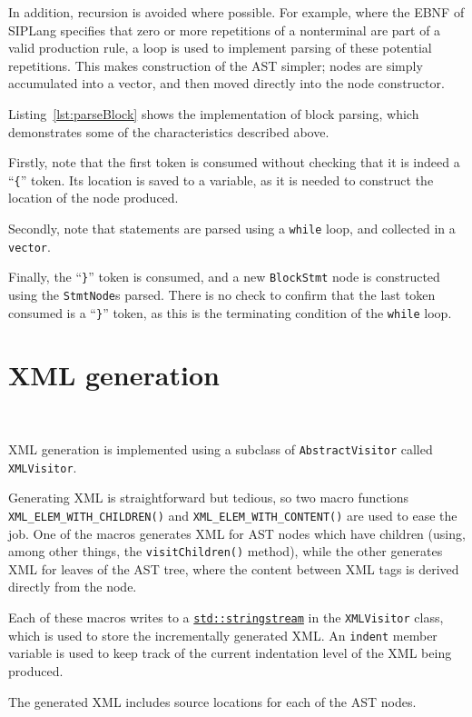 \documentclass[11pt,a4paper]{scrartcl}
\begin{document}
In addition, recursion is avoided where possible. For example, where the EBNF of SIPLang specifies that zero or more repetitions of a nonterminal are part of a valid production rule, a loop is used to implement parsing of these potential repetitions. This makes construction of the AST simpler; nodes are simply accumulated into a vector, and then moved directly into the node constructor.

Listing~\ref{lst:parseBlock} shows the implementation of block parsing, which demonstrates some of the characteristics described above.

Firstly, note that the first token is consumed without checking that it is indeed a ``\verb|{|'' token. Its location is saved to a variable, as it is needed to construct the location of the node produced.

Secondly, note that statements are parsed using a \verb!while! loop, and collected in a \verb!vector!.

Finally, the ``\verb|}|'' token is consumed, and a new \verb!BlockStmt! node is constructed using the \verb!StmtNode!s parsed. There is no check to confirm that the last token consumed is a ``\verb|}|'' token, as this is the terminating condition of the \verb!while! loop.

\newpage

\section{XML generation}~\label{sec:xml-visitor}

XML generation is implemented using a subclass of \verb!AbstractVisitor! called \verb!XMLVisitor!.

Generating XML is straightforward but tedious, so two macro functions \verb!XML_ELEM_WITH_CHILDREN()! and \verb!XML_ELEM_WITH_CONTENT()! are used to ease the job. One of the macros generates XML for AST nodes which have children (using, among other things, the \verb!visitChildren()! method), while the other generates XML for leaves of the AST tree, where the content between XML tags is derived directly from the node.

Each of these macros writes to a \href{https://en.cppreference.com/w/cpp/io/basic_stringstream}{\Verb!std::stringstream!} in the \verb!XMLVisitor! class, which is used to store the incrementally generated XML. An \verb!indent! member variable is used to keep track of the current indentation level of the XML being produced.

The generated XML includes source locations for each of the AST nodes.
\end{document}
